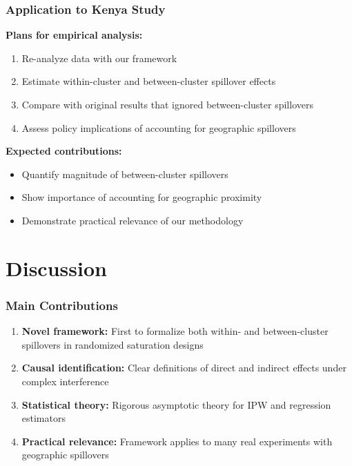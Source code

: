 \documentclass{beamer}
\begin{document}
\begin{frame}
\frametitle{Application to Kenya Study}
\textbf{Plans for empirical analysis:}
\begin{enumerate}
\item Re-analyze \cite{egger2022general} data with our framework
\item Estimate within-cluster and between-cluster spillover effects
\item Compare with original results that ignored between-cluster spillovers
\item Assess policy implications of accounting for geographic spillovers
\end{enumerate}

\vspace{0.5cm}
\textbf{Expected contributions:}
\begin{itemize}
\item Quantify magnitude of between-cluster spillovers
\item Show importance of accounting for geographic proximity
\item Demonstrate practical relevance of our methodology
\end{itemize}
\end{frame}

\section{Discussion}

\begin{frame}
\frametitle{Main Contributions}
\begin{enumerate}
\item \textbf{Novel framework:} First to formalize both within- and between-cluster spillovers in randomized saturation designs

\item \textbf{Causal identification:} Clear definitions of direct and indirect effects under complex interference

\item \textbf{Statistical theory:} Rigorous asymptotic theory for IPW and regression estimators

\item \textbf{Practical relevance:} Framework applies to many real experiments with geographic spillovers
\end{enumerate}
\end{frame}
\end{document}
